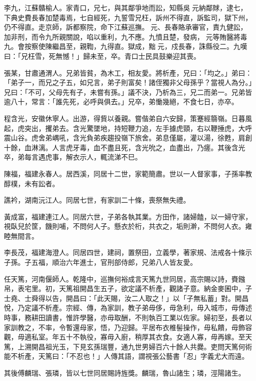\begin{pinyinscope}
李九，江蘇贛榆人。家青口，兄七，與其鄰爭地而訟，知縣吳元納鄰賕，逮七，下典史費長春加楚毒焉，七自經死，九誓雪兄枉，訴州不得直，訴監司，獄下州，仍不得直。走京師，訴都察院，命下江蘇巡撫。元、長春賂承審官，責九健訟，加非刑，而令九所親關說，啗以重利，九不應。九憤且楚，發病，元等賄醫將毒九。會按察使陳繼昌至，親鞫，九得直。獄成，黜元，戍長春，誅縣役二。九嘆曰：「兄枉雪，死無憾！」歸未至，卒。青口士民具鼓樂迎其喪。

張某，甘肅通渭人。兄弟皆貧，為木工，相友愛。將析產，兄曰：「均之。」弟曰：「弟子一，而兄之子五，如兄言，弟子則富矣！諸侄獨非父母孫乎？當視人為分。」兄曰：「不可，父母先有子，未嘗有孫。」議不決，乃析為三，兄二而弟一。兄弟皆逾八十，常言：「誰先死，必呼與俱去。」兄卒，弟慟幾絕，不食七日，亦卒。

程含光，安徽休寧人。出游，得貲以養親。嘗偕弟自六安歸，策蹇經篛嶺。日暮風起，虎突出，攫弟去。含光驚墜地，持短鞭力追，左手據虎頸，右以鞭捶虎，大呼震山谷。虎舍弟嵎吼，含光負弟疾趨投嶺下旅舍。弟息僅屬，灌以湯，徐甦，肩創十餘，血淋漓。人言虎牙毒，血不盡且死，含光吮之，血盡出，乃瘥。其後含光卒，弟每言遇虎事，解衣示人，輒流涕不巳。

陳福，福建永春人。居西溪，同居十二世，家範簡肅。世以一人督家事，子孫率教醇樸，未有訟者。

譙衿，湖南沅江人。同居七世，有家訓二十條，喪祭無失禮。

黃成富，福建連江人。同居六世，子弟各執其業。方田作，諸婦饁，以一婦守家，視臥兒於筐，饑則哺，不問何人子。懸衣於桁，共衣之，垢則澣，不問何人衣。雍睦無間言。

李長茂，福建海澄人。同居四世，建祠，置祭田，立義學，著家規、法戒各十條示子孫。子五福，順治六年進士，官刑部侍郎，兄弟八人皆友愛。

任天篤，河南偃師人。乾隆中，巡撫何裕成言天篤九世同居，高宗賜以詩，賚鏹帛，表宅里。初，天篤祖開昌生五子，欲定議不析產，觀諸子意。納金麥囷中，子士堯、士舜得以告，開昌曰：「此天賜，汝二人取之！」以「子無私蓄」對。開昌悅，乃定議不析產。宗經、傳，為家訓，教子弟毋侈，毋急利，毋入城市，毋傳述時事，務耕田讀書，惟許學醫，亦毋取酬，不則執百工業以佐家。婦初至，長者以家訓教之，不率，令暫還母家，悟，乃迎歸。平居布衣椎髻操作，毋私饋，毋飾容觀，毋適私室。年五十不執役，寡毋入廚，稍厚其衣食。女適人寡，毋再嫁。至天篤，上溯開昌祖光玉，下見玄孫瑞豐，通九世男婦百六十餘人共爨。吏問天篤何術能不析產，天篤曰：「不忍也！」人傳其語，謂視張公藝書「忍」字義尤大而遠。

其後傅麟瑞、張璘，皆以七世同居賜詩旌獎。麟瑞，魯山諸生；璘，涇陽諸生。


\end{pinyinscope}

